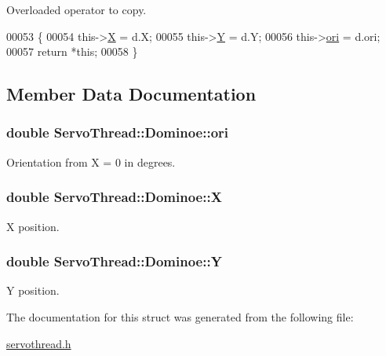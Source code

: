 Overloaded operator to copy. 


\begin{DoxyCode}
00053         \{
00054             this->\hyperlink{a00002_a8caa44969c79e0e46576da349957975b}{X} = d.X;
00055             this->\hyperlink{a00002_ae7711996c8204586b6d8a5e657c4b06a}{Y} = d.Y;
00056             this->\hyperlink{a00002_a451efc4d2eb2f1dd10006c6c49846e8d}{ori} = d.ori;
00057             \textcolor{keywordflow}{return} *\textcolor{keyword}{this};
00058         \}
\end{DoxyCode}


\subsection{Member Data Documentation}
\hypertarget{a00002_a451efc4d2eb2f1dd10006c6c49846e8d}{}
\subsubsection[{ori}]{\setlength{\rightskip}{0pt plus 5cm}double Servo\+Thread\+::\+Dominoe\+::ori}\label{a00002_a451efc4d2eb2f1dd10006c6c49846e8d}


Orientation from X = 0 in degrees. 

\hypertarget{a00002_a8caa44969c79e0e46576da349957975b}{}
\subsubsection[{X}]{\setlength{\rightskip}{0pt plus 5cm}double Servo\+Thread\+::\+Dominoe\+::\+X}\label{a00002_a8caa44969c79e0e46576da349957975b}


X position. 

\hypertarget{a00002_ae7711996c8204586b6d8a5e657c4b06a}{}
\subsubsection[{Y}]{\setlength{\rightskip}{0pt plus 5cm}double Servo\+Thread\+::\+Dominoe\+::\+Y}\label{a00002_ae7711996c8204586b6d8a5e657c4b06a}


Y position. 



The documentation for this struct was generated from the following file\+:\begin{DoxyCompactItemize}
\item 
\hyperlink{a00024}{servothread.\+h}\end{DoxyCompactItemize}
